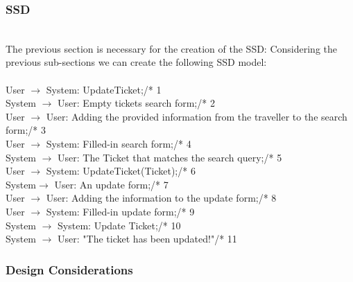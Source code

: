 \subsubsection{SSD}
\creator{\studentB}
\\
The previous section is necessary for the creation of the SSD:
Considering the previous sub-sections we can create the following SSD model:\\\\
User $\rightarrow$ System: UpdateTicket;\hfill /* 1\\
System $\rightarrow$ User: Empty tickets search form;\hfill /* 2\\
User $\rightarrow$ User: Adding the provided information from the traveller to the search form;\hfill /* 3\\
User $\rightarrow$ System: Filled-in search form;\hfill /* 4\\
System $\rightarrow$ User: The Ticket that matches the search query;\hfill /* 5\\
User $\rightarrow$ System: UpdateTicket(Ticket);\hfill /* 6\\
System$\rightarrow$ User: An update form;\hfill /* 7\\
User $\rightarrow$ User: Adding the information to the update form;\hfill /* 8\\
User $\rightarrow$ System: Filled-in update form;\hfill /* 9\\
System $\rightarrow$ System: Update Ticket;\hfill /* 10\\
System $\rightarrow$ User: "The ticket has been updated!"\hfill /* 11\\
\iffalse

\subsubsection{Grey box SD}
\creator{Name \textsc{Surname}}
\updater{Name \textsc{Surname}}

\subsubsection{Whte box SD}
\creator{Name \textsc{Surname}}
\updater{Name \textsc{Surname}}

\fi

\subsubsection{Design Considerations}